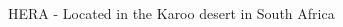 \documentclass[a0,landscape]{a0poster}
\begin{document}
\begin{multicols}{4}

\begin{figure}[H]
\centering
\label{fig:HERA}
\caption{HERA - Located in the Karoo desert in South Africa}
\end{figure}




\end{multicols}
\end{document}
